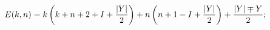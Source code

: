 \begin{equation}
E(k,n)= k\left(k+n+2+I+{|Y|\over 2}\right) 
+n\left(n+1-I+{|Y|\over 2}\right)+{|Y|\mp Y\over 2};\nonumber \\
\label{spindown}
\end{equation}

